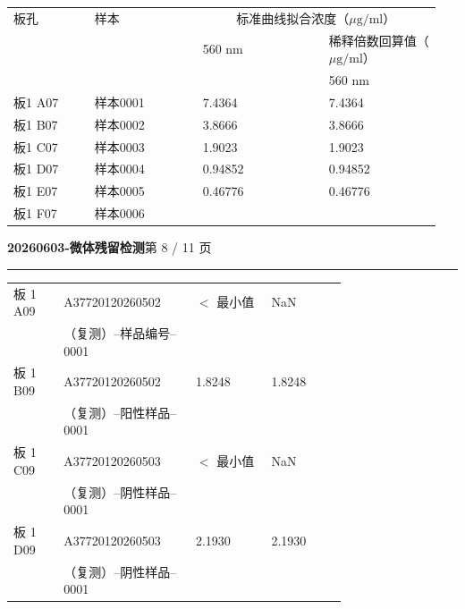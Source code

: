 \documentclass[UTF8,10pt,a4paper,fontset=fandol]{ctexart}
\newcommand{\fieldvalue}[1]{#1}
\begin{document}
\small
\begin{tabular}{p{0.18\linewidth}p{0.24\linewidth}p{0.28\linewidth}p{0.25\linewidth}}
板孔 & 样本 & \multicolumn{2}{c}{标准曲线拟合浓度（$\mu\mathrm{g}/\mathrm{ml}$）}\\
 & & 560 nm & 稀释倍数回算值（$\mu\mathrm{g}/\mathrm{ml}$）\\
 & & & 560 nm\\ \hline
板1 A07 & 样本0001 & 
\fieldvalue{7.4364}
&
\fieldvalue{7.4364}
\\
板1 B07 & 样本0002 &
\fieldvalue{3.8666}
&
\fieldvalue{3.8666}
\\
板1 C07 & 样本0003 &
\fieldvalue{1.9023}
&
\fieldvalue{1.9023}
\\
板1 D07 & 样本0004 &
\fieldvalue{0.94852}
&
\fieldvalue{0.94852}
\\
板1 E07 & 样本0005 &
\fieldvalue{0.46776}
&
\fieldvalue{0.46776}
\\
板1 F07 & 样本0006 &
\fieldvalue{\mathrm{NaN}}
&
\fieldvalue{\mathrm{NaN}}
\end{tabular}
\normalsize

\newpage

\begin{center}
\textbf{20260603-微体残留检测}\hfill 第 8 / 11 页
\end{center}
\hrule

\begin{tabular}{p{0.12\linewidth}p{0.26\linewidth}p{0.18\linewidth}p{0.18\linewidth}}
板 1 A09 & A37720120260502 & $<$ 最小值 & NaN\\
& （复测）--样品编号--0001 & & \\[2pt]
板 1 B09 & A37720120260502 & 1.8248 & 1.8248\\
& （复测）--阳性样品--0001 & & \\[2pt]
板 1 C09 & A37720120260503 & $<$ 最小值 & NaN\\
& （复测）--阴性样品--0001 & & \\[2pt]
板 1 D09 & A37720120260503 & 2.1930 & 2.1930\\
& （复测）--阴性样品--0001 & &
\end{tabular}
\end{document}
